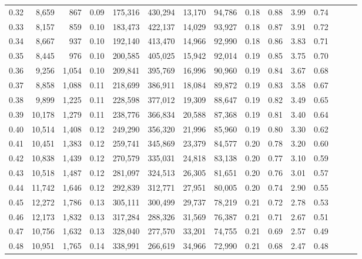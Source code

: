 \begin{tabular}{rrrrrrrrrrrrrrr}
0.32 &   8,659 &    867 &  0.09 &  175,316 &  430,294 &   13,170 &   94,786 &  0.18 &  0.88 &  3.99 &      0.74 \\
0.33 &   8,157 &    859 &  0.10 &  183,473 &  422,137 &   14,029 &   93,927 &  0.18 &  0.87 &  3.91 &      0.72 \\
0.34 &   8,667 &    937 &  0.10 &  192,140 &  413,470 &   14,966 &   92,990 &  0.18 &  0.86 &  3.83 &      0.71 \\
0.35 &   8,445 &    976 &  0.10 &  200,585 &  405,025 &   15,942 &   92,014 &  0.19 &  0.85 &  3.75 &      0.70 \\
0.36 &   9,256 &  1,054 &  0.10 &  209,841 &  395,769 &   16,996 &   90,960 &  0.19 &  0.84 &  3.67 &      0.68 \\
0.37 &   8,858 &  1,088 &  0.11 &  218,699 &  386,911 &   18,084 &   89,872 &  0.19 &  0.83 &  3.58 &      0.67 \\
0.38 &   9,899 &  1,225 &  0.11 &  228,598 &  377,012 &   19,309 &   88,647 &  0.19 &  0.82 &  3.49 &      0.65 \\
0.39 &  10,178 &  1,279 &  0.11 &  238,776 &  366,834 &   20,588 &   87,368 &  0.19 &  0.81 &  3.40 &      0.64 \\
0.40 &  10,514 &  1,408 &  0.12 &  249,290 &  356,320 &   21,996 &   85,960 &  0.19 &  0.80 &  3.30 &      0.62 \\
0.41 &  10,451 &  1,383 &  0.12 &  259,741 &  345,869 &   23,379 &   84,577 &  0.20 &  0.78 &  3.20 &      0.60 \\
0.42 &  10,838 &  1,439 &  0.12 &  270,579 &  335,031 &   24,818 &   83,138 &  0.20 &  0.77 &  3.10 &      0.59 \\
0.43 &  10,518 &  1,487 &  0.12 &  281,097 &  324,513 &   26,305 &   81,651 &  0.20 &  0.76 &  3.01 &      0.57 \\
0.44 &  11,742 &  1,646 &  0.12 &  292,839 &  312,771 &   27,951 &   80,005 &  0.20 &  0.74 &  2.90 &      0.55 \\
0.45 &  12,272 &  1,786 &  0.13 &  305,111 &  300,499 &   29,737 &   78,219 &  0.21 &  0.72 &  2.78 &      0.53 \\
0.46 &  12,173 &  1,832 &  0.13 &  317,284 &  288,326 &   31,569 &   76,387 &  0.21 &  0.71 &  2.67 &      0.51 \\
0.47 &  10,756 &  1,632 &  0.13 &  328,040 &  277,570 &   33,201 &   74,755 &  0.21 &  0.69 &  2.57 &      0.49 \\
0.48 &  10,951 &  1,765 &  0.14 &  338,991 &  266,619 &   34,966 &   72,990 &  0.21 &  0.68 &  2.47 &      0.48 \\

\end{tabular}
